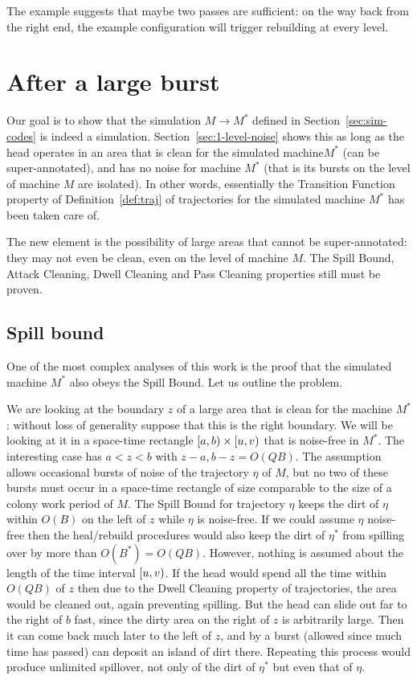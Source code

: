 \documentclass[12pt]{memoir}
\def\B{B}
\newcommand{\Q}{Q}
\begin{document}
The example suggests that maybe two passes are sufficient: on the way back from the right end, the
example configuration will trigger rebuilding at every level.



\section{After a large burst}

Our goal is to show that the simulation \( M\to M^{*} \)
defined in Section~\ref{sec:sim-codes} is indeed a simulation.
Section~\ref{sec:1-level-noise} shows this as long as the head operates in an
area that is clean for the simulated machine\( M^{*} \) (can be super-annotated), 
and has no noise for machine \( M^{*} \) (that is its bursts on the level of machine \( M \)
are isolated).
In other words, essentially the Transition Function property of Definition~\ref{def:traj} of
trajectories for the simulated machine \( M^{*} \) has been taken care of.

The new element is the possibility of large areas that cannot be super-annotated: they
may not even be clean, even on the level of machine \( M \).
The Spill Bound, Attack Cleaning, Dwell Cleaning and Pass Cleaning properties still must be proven.

\subsection{Spill bound}

One of the most complex analyses of this work is the proof that 
the simulated machine \( M^{*} \) also obeys the Spill Bound.
Let us outline the problem.

We are looking at the boundary \( z \) of a large area that is clean for the
machine \( M^{*} \): without loss of generality suppose that this is the right boundary.
We will be looking at it in a space-time rectangle \( \left[a,b\right)\times\left[u,v\right) \)
that is noise-free in \( M^{*} \).
The interesting case has \( a<z<b \) with \( z-a,b-z=O(\Q\B) \).
The assumption allows occasional bursts of noise of the trajectory \( \eta \) of \( M \),
but no two of these bursts must occur in a space-time rectangle of size comparable to
the size of a colony work period of \( M \).
The Spill Bound for trajectory \( \eta \) keeps the dirt of \( \eta \) within
\( O(\B) \) on the left of \( z \) while \( \eta \) is noise-free.
If we could assume \( \eta \) noise-free then the heal/rebuild procedures would also keep
the dirt of \( \eta^{*} \) from spilling over by more than \( O(\B^{*})=O(\Q\B) \).
However, nothing is assumed about the length of the time interval \( \left[u,v\right) \).
If the head would spend all the time within \( O(\Q\B) \) of \( z \) then due to 
the Dwell Cleaning property of trajectories,  the area would be cleaned out, again
preventing spilling.
But the head can slide out far to the right of \( b \) fast, since
the dirty area on the right of \( z \) is arbitrarily large.
Then it can come back much later to the left of \( z \), and by
a burst (allowed since much time has passed)
can deposit an island of dirt there.
Repeating this process would produce unlimited spillover, not only 
of the dirt of \( \eta^{*} \) but even that of \( \eta \).
\end{document}

